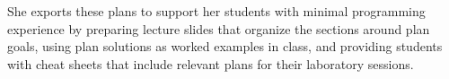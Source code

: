 She exports these plans to support her students with minimal programming experience by preparing lecture slides that organize the sections around plan goals, using plan solutions as worked examples in class, and providing students with cheat sheets that include relevant plans for their laboratory sessions.

